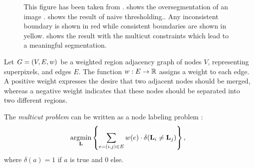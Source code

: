 \begin{figure}[h]
{    }
    \caption[Naive thresholding vs. multicuts]{
    This figure has been taken from \cite{andres_2011_iccv} .
     shows the oversegmentation of 
    an image .
     shows the result of naive thresholding..
    Any inconsistent boundary is shown in red while consistent
    boundaries are shown in yellow. 
     shows the result with the multicut
    constraints which lead to a meaningful segmentation.
    } \label{fig:naive_thresholding}
\end{figure}



Let $G=(V,E, w)$ be a weighted region adjacency graph of
nodes $V$, representing superpixels,
and edges $E$.
%
The function $w : E \rightarrow \mathbb{R}$ assigns a weight to each edge.
A positive weight expresses the desire that two adjacent nodes should
be merged, whereas a negative weight indicates
that these nodes should be separated into two different regions.


The \emph{multicut problem} can be written as a node labeling problem
\cite{bagon_2011_arxiv}:
%
\begin{align}
\operatorname*{\arg\!\min}_{\mathbf{L}}
    \left\{
    \sum_{ e=(i,j) \in E}
        w(e)
        \cdot \delta( \mathbf{L}_i \neq \mathbf{L}_j )
    \right\},
    \label{eq:multicut_primal_a}
\end{align}
%
where $\delta(a) = 1$ if $a$ is true and $0$ else.


